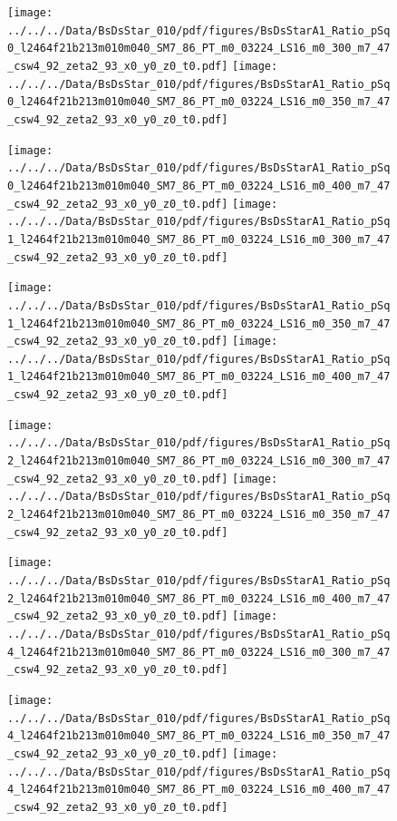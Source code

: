 \documentclass[a4paper,10pt]{article}
\begin{document}
\begin{figure}[p]
 \texttt{[image: ../../../Data/BsDsStar\_010/pdf/figures/BsDsStarA1\_Ratio\_pSq0\_l2464f21b213m010m040\_SM7\_86\_PT\_m0\_03224\_LS16\_m0\_300\_m7\_47\_csw4\_92\_zeta2\_93\_x0\_y0\_z0\_t0.pdf]} 
 \texttt{[image: ../../../Data/BsDsStar\_010/pdf/figures/BsDsStarA1\_Ratio\_pSq0\_l2464f21b213m010m040\_SM7\_86\_PT\_m0\_03224\_LS16\_m0\_350\_m7\_47\_csw4\_92\_zeta2\_93\_x0\_y0\_z0\_t0.pdf]} 
 \end{figure}
\begin{figure}[p]
 \texttt{[image: ../../../Data/BsDsStar\_010/pdf/figures/BsDsStarA1\_Ratio\_pSq0\_l2464f21b213m010m040\_SM7\_86\_PT\_m0\_03224\_LS16\_m0\_400\_m7\_47\_csw4\_92\_zeta2\_93\_x0\_y0\_z0\_t0.pdf]} 
 \texttt{[image: ../../../Data/BsDsStar\_010/pdf/figures/BsDsStarA1\_Ratio\_pSq1\_l2464f21b213m010m040\_SM7\_86\_PT\_m0\_03224\_LS16\_m0\_300\_m7\_47\_csw4\_92\_zeta2\_93\_x0\_y0\_z0\_t0.pdf]} 
 \end{figure}
\begin{figure}[p]
 \texttt{[image: ../../../Data/BsDsStar\_010/pdf/figures/BsDsStarA1\_Ratio\_pSq1\_l2464f21b213m010m040\_SM7\_86\_PT\_m0\_03224\_LS16\_m0\_350\_m7\_47\_csw4\_92\_zeta2\_93\_x0\_y0\_z0\_t0.pdf]} 
 \texttt{[image: ../../../Data/BsDsStar\_010/pdf/figures/BsDsStarA1\_Ratio\_pSq1\_l2464f21b213m010m040\_SM7\_86\_PT\_m0\_03224\_LS16\_m0\_400\_m7\_47\_csw4\_92\_zeta2\_93\_x0\_y0\_z0\_t0.pdf]} 
 \end{figure}
\clearpage
\begin{figure}[p]
 \texttt{[image: ../../../Data/BsDsStar\_010/pdf/figures/BsDsStarA1\_Ratio\_pSq2\_l2464f21b213m010m040\_SM7\_86\_PT\_m0\_03224\_LS16\_m0\_300\_m7\_47\_csw4\_92\_zeta2\_93\_x0\_y0\_z0\_t0.pdf]} 
 \texttt{[image: ../../../Data/BsDsStar\_010/pdf/figures/BsDsStarA1\_Ratio\_pSq2\_l2464f21b213m010m040\_SM7\_86\_PT\_m0\_03224\_LS16\_m0\_350\_m7\_47\_csw4\_92\_zeta2\_93\_x0\_y0\_z0\_t0.pdf]} 
 \end{figure}
\begin{figure}[p]
 \texttt{[image: ../../../Data/BsDsStar\_010/pdf/figures/BsDsStarA1\_Ratio\_pSq2\_l2464f21b213m010m040\_SM7\_86\_PT\_m0\_03224\_LS16\_m0\_400\_m7\_47\_csw4\_92\_zeta2\_93\_x0\_y0\_z0\_t0.pdf]} 
 \texttt{[image: ../../../Data/BsDsStar\_010/pdf/figures/BsDsStarA1\_Ratio\_pSq4\_l2464f21b213m010m040\_SM7\_86\_PT\_m0\_03224\_LS16\_m0\_300\_m7\_47\_csw4\_92\_zeta2\_93\_x0\_y0\_z0\_t0.pdf]} 
 \end{figure}
\begin{figure}[p]
 \texttt{[image: ../../../Data/BsDsStar\_010/pdf/figures/BsDsStarA1\_Ratio\_pSq4\_l2464f21b213m010m040\_SM7\_86\_PT\_m0\_03224\_LS16\_m0\_350\_m7\_47\_csw4\_92\_zeta2\_93\_x0\_y0\_z0\_t0.pdf]} 
 \texttt{[image: ../../../Data/BsDsStar\_010/pdf/figures/BsDsStarA1\_Ratio\_pSq4\_l2464f21b213m010m040\_SM7\_86\_PT\_m0\_03224\_LS16\_m0\_400\_m7\_47\_csw4\_92\_zeta2\_93\_x0\_y0\_z0\_t0.pdf]} 
 \end{figure}
\end{document}
